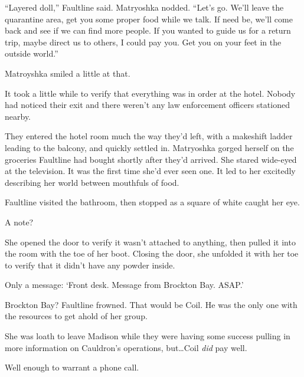 ``Layered doll,'' Faultline said.  Matryoshka nodded.  ``Let's go.  We'll leave the quarantine area, get you some proper food while we talk.  If need be, we'll come back and see if we can find more people.  If you wanted to guide us for a return trip, maybe direct us to others, I could pay you.  Get you on your feet in the outside world.''



Matroyshka smiled a little at that.



\blacksquare



It took a little while to verify that everything was in order at the hotel.  Nobody had noticed their exit and there weren't any law enforcement officers stationed nearby.



They entered the hotel room much the way they'd left, with a makeshift ladder leading to the balcony, and quickly settled in.  Matryoshka gorged herself on the groceries Faultline had bought shortly after they'd arrived.  She stared wide-eyed at the television.  It was the first time she'd ever seen one.  It led to her excitedly describing her world between mouthfuls of food.



Faultline visited the bathroom, then stopped as a square of white caught her eye.



A note?



She opened the door to verify it wasn't attached to anything, then pulled it into the room with the toe of her boot.  Closing the door, she unfolded it with her toe to verify that it didn't have any powder inside.



Only a message: `Front desk.  Message from Brockton Bay.  ASAP.'



Brockton Bay?  Faultline frowned.  That would be Coil.  He was the only one with the resources to get ahold of her group.



She was loath to leave Madison while they were having some success pulling in more information on Cauldron's operations, but\ldots Coil \emph{did} pay well.



Well enough to warrant a phone call.



